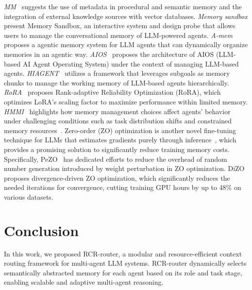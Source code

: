 \documentclass[letterpaper]{article} %
\begin{document}
\textit{MM}~\cite{hatalis2023memory} suggests the use of metadata in procedural and semantic memory and the integration of external knowledge sources with vector databases.
\textit{Memory sandbox} \cite{huang2023memory} present Memory Sandbox, an interactive system and design probe that allows users to manage the conversational memory of LLM-powered agents. 
\textit{A-mem} \cite{xu2025mem} proposes a agentic memory system for LLM agents that can dynamically organize memories in an agentic way.
\textit{AIOS}~\cite{mei2024aios} proposes the architecture of AIOS (LLM-based AI Agent Operating System) under the context of managing LLM-based agents.
\textit{HIAGENT}~\cite{hu2024hiagent} utilizes a framework that leverages subgoals as
memory chunks to manage the working memory of LLM-based agents hierarchically.
\textit{RoRA}~\cite{liu2025rora} proposes Rank-adaptive Reliability Optimization (RoRA), which optimizes LoRA's scaling factor to maximize performance within limited memory.
\textit{HMMI}~\cite{xiong2025memory} highlights how memory management choices affect agents’ behavior under challenging conditions such as task distribution shifts and constrained memory resources~\cite{liu2024tsla,liu2023scalable}.
Zero-order (ZO) optimization is another novel fine-tuning technique for LLMs that estimates gradients purely through inference~\cite{malladi2023fine}, which provides a promising solution to significantly reduce training memory costs. 
Specifically, PeZO~\cite{tan2025perturbation} has dedicated efforts to reduce the overhead of random number generation introduced by weight perturbation in ZO optimization.
DiZO~\cite{tan2025harmony} proposes divergence-driven ZO optimization, which significantly reduces the needed iterations for convergence, cutting training GPU hours by up to 48\% on various datasets. 


\section{Conclusion}

In this work, we proposed RCR-router, a modular and resource-efficient context routing framework for multi-agent LLM systems. RCR-router dynamically selects semantically abstracted memory for each agent based on its role and task stage, enabling scalable and adaptive multi-agent reasoning.
\end{document}
